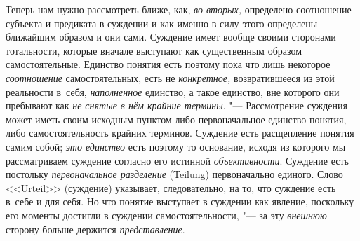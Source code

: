 Теперь нам нужно рассмотреть ближе, как, {\em во-вторых,}
определено соотношение субъекта и предиката в суждении и как
именно в силу этого определены ближайшим образом и они сами. Суждение имеет
вообще своими сторонами тотальности, которые вначале выступают как
существенным образом самостоятельные. Единство понятия есть поэтому пока
что лишь некоторое {\em соотношение} самостоятельных, есть не
{\em конкретное,} возвратившееся из этой реальности в~себя, {\em наполненное}
единство, а такое единство, вне которого они пребывают как {\em не снятые
в нём крайние термины}. "--- Рассмотрение суждения может иметь своим
исходным пунктом либо первоначальное единство понятия, либо
самостоятельность крайних терминов. Суждение есть расщепление понятия самим
собой; {\em это единство} есть поэтому то основание, исходя из которого мы
рассматриваем суждение согласно его истинной {\em объективности}.
Суждение есть постольку {\em первоначальное разделение}
(Teilung) первоначально единого. Слово <<Urteil>> (суждение)
указывает, следовательно, на то, что суждение есть в~себе и для себя. Но
что понятие выступает в суждении как явление, поскольку его моменты
достигли в суждении самостоятельности, "--- за эту {\em внешнюю} сторону
больше держится {\em представление}.

